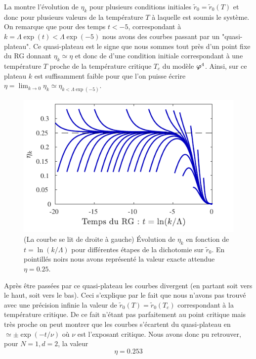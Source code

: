\documentclass[10.5pt]{article}
\begin{document}
\begin{multicols*}{2}
La  montre l'évolution de $\eta_k$ pour plusieurs conditions initiales $\tilde{r}_0 = \tilde{r}_0(T)$ et donc pour plusieurs valeurs de la température $T$ à laquelle est soumis le système. On remarque que pour des temps $t<-5$, correspondant à $k = \Lambda\exp(t)< \Lambda \exp(-5)$ nous avons des courbes passant par un "quasi-plateau". Ce quasi-plateau est le signe que nous sommes tout près d'un point fixe du RG donnant $\eta_k \simeq \eta$ et donc de d'une condition initiale correspondant à une température $T$ proche de la température critique $T_c$ du modèle $\boldsymbol{ \varphi}^4$. Ainsi, sur ce plateau $k$ est suffisamment faible pour que l'on puisse écrire $\eta = \lim_{k\to 0} \eta_k \simeq \eta_{k<\Lambda\exp(-5)}$. 
\begin{figure}[H]
	\begin{center}
		\includegraphics[width=0.95\columnwidth]{etakd2.pdf}
		\caption{(La courbe se lit de droite à gauche) Évolution de $\eta_k$ en fonction de $t= \ln(k/\Lambda)$ pour différentes étapes de la dichotomie sur $\tilde{r}_0$. En pointillés noirs nous avons représenté la valeur exacte attendue $\eta = 0.25$. }
		\label{fig:etakd2}
	\end{center}
\end{figure}
\vspace*{-20pt}
Après être passées par ce quasi-plateau les courbes divergent (en partant soit vers le haut, soit vers le bas). Ceci s'explique par le fait que nous n'avons pas trouvé avec une précision infinie la valeur de $\tilde{r}_0(T) = \tilde{r}_0(T_c)$ correspondant à la température critique. De ce fait n'étant pas parfaitement au point critique mais très proche on peut montrer que les courbes s'écartent du quasi-plateau en $\simeq \pm \exp(-t/\nu)$ où $\nu$ est l'exposant critique. Nous avons donc pu retrouver, pour $N=1, d =2$, la valeur
\begin{equation}
	\eta = 0.253 %
\end{equation}


\end{multicols*}
\end{document}
